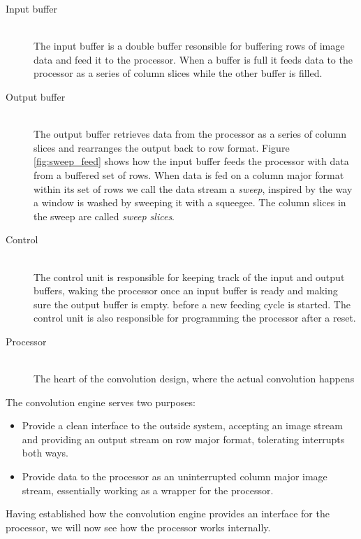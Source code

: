 \begin{description}
    \item[Input buffer] \hfill\\
        The input buffer is a double buffer resonsible for buffering rows of image data and feed it to the processor.
        When a buffer is full it feeds data to the processor as a series of column slices while the other buffer is filled.
    \item[Output buffer] \hfill\\
        The output buffer retrieves data from the processor as a series of column slices and rearranges the output back to row format.
        Figure \ref{fig:sweep_feed} shows how the input buffer feeds the processor with data from a buffered set of rows.
        When data is fed on a column major format within its set of rows we call the data stream a \textit{sweep}, inspired by the way a window is washed by sweeping it with a squeegee.
        The column slices in the sweep are called \textit{sweep slices}.
    \item[Control] \hfill\\
        The control unit is responsible for keeping track of the input and output buffers, waking the processor once an input buffer is ready and making sure the output buffer is empty.
        before a new feeding cycle is started.
        The control unit is also responsible for programming the processor after a reset.
    \item[Processor] \hfill\\
        The heart of the convolution design, where the actual convolution happens
\end{description}

The convolution engine serves two purposes:
\begin{itemize}
    \item Provide a clean interface to the outside system, accepting an image stream and providing an output stream on row major format, tolerating interrupts both ways.
    \item Provide data to the processor as an uninterrupted column major image stream, essentially working as a wrapper for the processor.
\end{itemize}

Having established how the convolution engine provides an interface for the processor, we will now see how the processor works internally.

